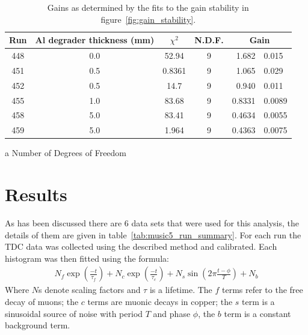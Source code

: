 \begin{table}
    \begin{center}
        \begin{threeparttable}
            \begin{tabular}{c|c|c|c|r@{ $\pm$ }l}
                Run & Al degrader thickness (mm) & $\chi^2$ 
                                                 & N.D.F. \tnote{a}
                                                 & \multicolumn{2}{|c}{Gain} \\
                \hline
                448  &  0.0  &  52.94   &  9  &  1.682  &  0.015  \\
                451  &  0.5  &  0.8361  &  9  &  1.065  &  0.029  \\
                452  &  0.5  &  14.7    &  9  &  0.940  &  0.011  \\
                455  &  1.0  &  83.68   &  9  &  0.8331 &  0.0089 \\
                458  &  5.0  &  83.41   &  9  &  0.4634 &  0.0055 \\
                459  &  5.0  &  1.964   &  9  &  0.4363 &  0.0075 \\
            \end{tabular}
            \caption{Gains as determined by the fits to the gain stability in figure~\ref{fig:gain_stability}.}
            \begin{tablenotes}
                \item [a] Number of Degrees of Freedom
            \end{tablenotes}
            \label{tab:gain_stability_paramters}
        \end{threeparttable}
    \end{center}
\end{table}

\section{Results} %
\label{sec:results}
As has been discussed there are 6 data sets that were used for this analysis, the details of them are given in table~\ref{tab:music5_run_summary}. For each run the TDC data was collected using the described method and calibrated. Each histogram was then fitted using the formula:
\begin{align}
  N_{f}\exp(\frac{-t}{\tau_{f}}) + N_{c}\exp(\frac{-t}{\tau_{c}}) + N_{s}\sin(2\pi\frac{t-\phi}{T}) + N_{b} \label{equ:fit}
\end{align}
Where \(N\)s denote scaling factors and \(\tau\) is a lifetime. The \(f\) terms refer to the free decay of muons; the \(c\) terms are muonic decays in copper; the \(s\) term is a sinusoidal source of noise with period \(T\) and phase \(\phi\), the \(b\) term is a constant background term.

